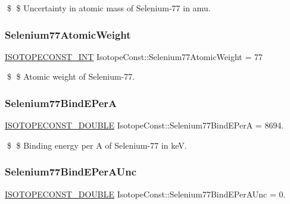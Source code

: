 \$ \$ Uncertainty in atomic mass of Selenium-\/77 in amu. \mbox{\label{group___isotope_const-_selenium-_se77_gadb6cd2a71f7262e6239540dad0996fae}} 
\subsubsection{\texorpdfstring{Selenium77\+Atomic\+Weight}{Selenium77AtomicWeight}}
{\footnotesize\ttfamily \mbox{\hyperlink{group___isotope_const-_macros_ga5f18360b3e99483a35c32d789e62621c}{I\+S\+O\+T\+O\+P\+E\+C\+O\+N\+S\+T\+\_\+\+I\+NT}} Isotope\+Const\+::\+Selenium77\+Atomic\+Weight = 77}

\$ \$ Atomic weight of Selenium-\/77. \mbox{\label{group___isotope_const-_selenium-_se77_ga6489c2bdf26ff108af2b28082fa04d2c}} 
\subsubsection{\texorpdfstring{Selenium77\+Bind\+E\+PerA}{Selenium77BindEPerA}}
{\footnotesize\ttfamily \mbox{\hyperlink{group___isotope_const-_macros_ga8f45a7272ce02c0b4c65c44636ed719a}{I\+S\+O\+T\+O\+P\+E\+C\+O\+N\+S\+T\+\_\+\+D\+O\+U\+B\+LE}} Isotope\+Const\+::\+Selenium77\+Bind\+E\+PerA = 8694.}

\$ \$ Binding energy per A of Selenium-\/77 in keV. \mbox{\label{group___isotope_const-_selenium-_se77_ga7c1501771c4a3e979cec329e4b481ef2}} 
\subsubsection{\texorpdfstring{Selenium77\+Bind\+E\+Per\+A\+Unc}{Selenium77BindEPerAUnc}}
{\footnotesize\ttfamily \mbox{\hyperlink{group___isotope_const-_macros_ga8f45a7272ce02c0b4c65c44636ed719a}{I\+S\+O\+T\+O\+P\+E\+C\+O\+N\+S\+T\+\_\+\+D\+O\+U\+B\+LE}} Isotope\+Const\+::\+Selenium77\+Bind\+E\+Per\+A\+Unc = 0.}

